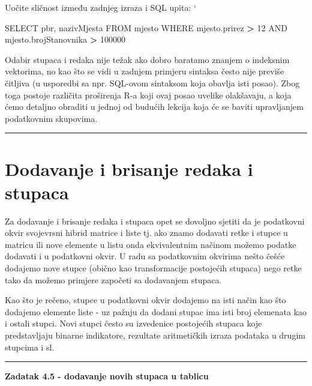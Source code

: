 \documentclass[]{book}
\newenvironment{Shaded}{\begin{snugshade}}{\end{snugshade}}
\newcommand{\DecValTok}[1]{\textcolor[rgb]{0.00,0.00,0.81}{#1}}
\newcommand{\StringTok}[1]{\textcolor[rgb]{0.31,0.60,0.02}{#1}}
\newcommand{\OperatorTok}[1]{\textcolor[rgb]{0.81,0.36,0.00}{\textbf{#1}}}
\newcommand{\NormalTok}[1]{#1}
\theoremstyle{definition}
\theoremstyle{definition}
\theoremstyle{definition}
\theoremstyle{remark}
\begin{document}
Uočite sličnost između zadnjeg izraza i SQL upita: `

\begin{Shaded}
\begin{Highlighting}[]
\NormalTok{SELECT pbr, nazivMjesta}
\NormalTok{FROM mjesto}
\NormalTok{WHERE mjesto.prirez }\OperatorTok{>}\StringTok{ }\DecValTok{12}\NormalTok{ AND mjesto.brojStanovnika }\OperatorTok{>}\StringTok{ }\DecValTok{100000}
\end{Highlighting}
\end{Shaded}

Odabir stupaca i redaka nije težak ako dobro baratamo znanjem o
indeksnim vektorima, no kao što se vidi u zadnjem primjeru sintaksa
često nije previše čitljiva (u usporedbi sa npr. SQL-ovom sintaksom koja
obavlja isti posao). Zbog toga postoje različita proširenja R-a koji
ovaj posao uvelike olakšavaju, a koja ćemo detaljno obraditi u jednoj od
budućih lekcija koja će se baviti upravljanjem podatkovnim skupovima.

\begin{center}\rule{0.5\linewidth}{\linethickness}\end{center}

\section{Dodavanje i brisanje redaka i
stupaca}\label{dodavanje-i-brisanje-redaka-i-stupaca}

Za dodavanje i brisanje redaka i stupaca opet se dovoljno sjetiti da je
podatkovni okvir svojevrsni hibrid matrice i liste tj. ako znamo
dodavati retke i stupce u matricu ili nove elemente u listu onda
ekvivalentnim načinom možemo podatke dodavati i u podatkovni okvir. U
radu sa podatkovnim okvirima nešto češće dodajemo nove stupce (obično
kao transformacije postojećih stupaca) nego retke tako da možemo
primjere započeti sa dodavanjem stupaca.

Kao što je rečeno, stupce u podatkovni okvir dodajemo na isti način kao
što dodajemo elemente liste - uz pažnju da dodani stupac ima isti broj
elemenata kao i ostali stupci. Novi stupci često su izvedenice
postojećih stupaca koje predstavljaju binarne indikatore, rezultate
aritmetičkih izraza podataka u drugim stupcima i sl.

\begin{center}\rule{0.5\linewidth}{\linethickness}\end{center}

\textbf{Zadatak 4.5 - dodavanje novih stupaca u tablicu}
\end{document}
